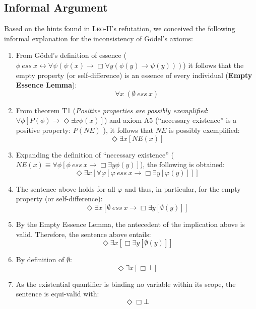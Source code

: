 \documentclass{article}
\newcommand{\imp}{{\rightarrow}}
\newcommand{\biimp}{\leftrightarrow}
\newcommand{\allq}{\forall}
\newcommand{\exq}{\exists}
\newcommand{\Dia}{\Diamond} %
\newcommand{\NE}{\mathit{NE}}
\newcommand{\ess}[2]{#1\ \mathit{ess}\ #2}
\newcommand{\nec}{\Box}
\newcommand{\pos}{\Dia}
\begin{document}

\subsection{Informal Argument} \label{sec:arg1}
Based on the hints found in \textsc{Leo-II}'s refutation, we conceived the following informal explanation for the inconsistency of G\"odel's axioms:

\begin{enumerate}
\item From G\"odel's definition of essence 
(${\ess{\phi}{x} \biimp {\allq \psi} (\psi(x)
\imp {\nec} \allq y (\phi(y) \imp \psi(y)))}$) it follows that the
empty property (or self-difference) is an essence of every individual (\textbf{Empty Essence Lemma}): 
$$\allq x\; (\ess{\emptyset}{x})$$

\item From theorem T1 (\textit{Positive properties are possibly
  exemplified}: ${\allq \phi} [P(\phi) \imp {\pos}  \exq x
  \phi(x)]$) and axiom A5 (``necessary existence'' is a positive property: $P(\NE)$ ), it follows that $\NE$ is possibly exemplified:
  $$
  \pos \exq x [\NE(x)]
  $$
 
\item Expanding the definition of ``necessary existence''
  (${\NE(x) \equiv \allq \phi [\ess{\phi}{x} \imp \nec \exq y
    \phi(y)]}$), the following is obtained:
  $$
  \pos \exq x [\allq \varphi [ \ess{\varphi}{x} \imp \nec \exq y [\varphi(y)] ] ]
  $$

\item The sentence above holds for all $\varphi$ and thus, in
  particular, for the empty property (or self-difference):
$$
\pos \exq x [ \ess{\emptyset}{x} \imp \nec \exq y [\emptyset(y)] ]
$$

\item By the Empty Essence Lemma, the antecedent of the implication above is valid. Therefore, the sentence above entails:
$$
\pos \exq x [ \nec \exq y [\emptyset(y)] ]
$$ 

\item By definition of $\emptyset$: 
$$
\pos \exq x [ \nec \bot ]
$$

\item As the existential quantifier is binding no variable within its scope, the sentence is equi-valid with:
$$\pos \nec \bot $$


\end{enumerate}
\end{document}
